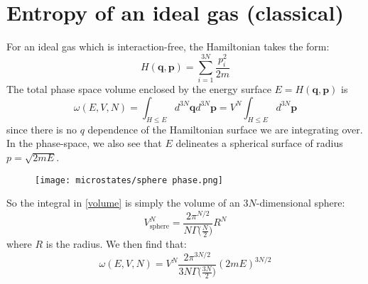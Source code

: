 \documentclass[a4paper,11pt,oneside]{book}
\begin{document}
\section{Entropy of an ideal gas (classical)}
For an ideal gas which is interaction-free, the Hamiltonian takes the form:
\begin{equation}
    {H}(\textbf{q},\textbf{p}) = \sum_{i=1}^{3N} \frac{p_i^2}{2m}
\end{equation}
The total phase space volume enclosed by the energy surface $E=H(\textbf{q}, \textbf{p})$ is
\begin{equation}\label{volume}
    \omega(E,V,N) = \int_{H\leq E} d^{3N} \textbf{q} d^{3N} \textbf{p} =V^N \int_{H\leq E} d^{3N} \textbf{p} 
\end{equation}
since there is no $q$ dependence of the Hamiltonian surface we are integrating over. In the phase-space, we also see that $E$ delineates a spherical surface of radius $p=\sqrt{2mE}$. 

\begin{figure}[h!]
    \centering
    \texttt{[image: microstates/sphere phase.png]}
    \label{fig:my_label}
\end{figure}


So the integral in \eqref{volume} is simply the volume of an $3N$-dimensional sphere:
\begin{equation}
    V_{\text{sphere}}^N = \frac{2\pi^{N/2}}{N \Gamma\big(\frac{N}{2}\big)}R^N
\end{equation}
where $R$ is the radius. We then find that:
\begin{equation}
    \omega(E,V,N) =V^N \frac{2\pi^{3N/2}}{3N \Gamma\big(\frac{3N}{2}\big)}(2mE)^{3N/2}
\end{equation}
\end{document}
